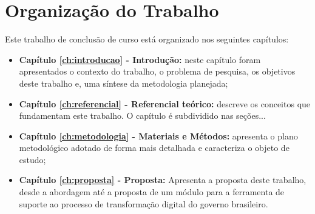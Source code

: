 \section{Organização do Trabalho}

Este trabalho de conclusão de curso está organizado nos seguintes capítulos:

\begin{itemize}

 \item \textbf{Capítulo \ref{ch:introducao} - Introdução:} neste capítulo foram apresentados o contexto do trabalho,  o problema de pesquisa, os objetivos deste trabalho e, uma síntese da metodologia planejada;
 
    \item \textbf{Capítulo \ref{ch:referencial} - Referencial teórico:} descreve os conceitos que fundamentam este trabalho. O capítulo é subdividido nas seções...
    
     \item \textbf{Capítulo \ref{ch:metodologia} - Materiais e Métodos:} apresenta o plano metodológico adotado de forma mais detalhada e caracteriza o objeto de estudo;
     
     \item \textbf{Capítulo \ref{ch:proposta} - Proposta:} Apresenta a proposta deste trabalho, desde a abordagem até a proposta de um módulo para a ferramenta de suporte ao processo de transformação digital do governo brasileiro.

\end{itemize}